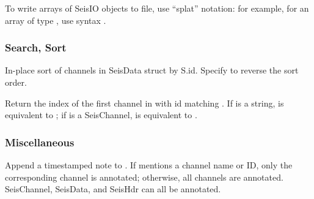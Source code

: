 \documentclass[letterpaper,11pt,english]{sphinxmanual}
\begin{document}
To write arrays of SeisIO objects to file, use “splat” notation: for example, for an array  of type , use syntax .


\subsubsection{Search, Sort}
\label{\detokenize{src/seisdata:search-sort}}

\begin{fulllineitems}
\end{fulllineitems}


In-place sort of channels in SeisData struct  by S.id. Specify  to reverse the sort order.


\begin{fulllineitems}
\end{fulllineitems}


Return the index of the first channel in  with id matching . If  is a string,  is equivalent to ; if  is a SeisChannel,  is equivalent to .


\subsubsection{Miscellaneous}
\label{\detokenize{src/seisdata:miscellaneous}}

\begin{fulllineitems}
\end{fulllineitems}


Append a timestamped note to . If  mentions a channel name or ID, only the corresponding channel is annotated; otherwise, all channels are annotated. SeisChannel, SeisData, and SeisHdr can all be annotated.


\begin{fulllineitems}
\end{fulllineitems}
\end{document}
